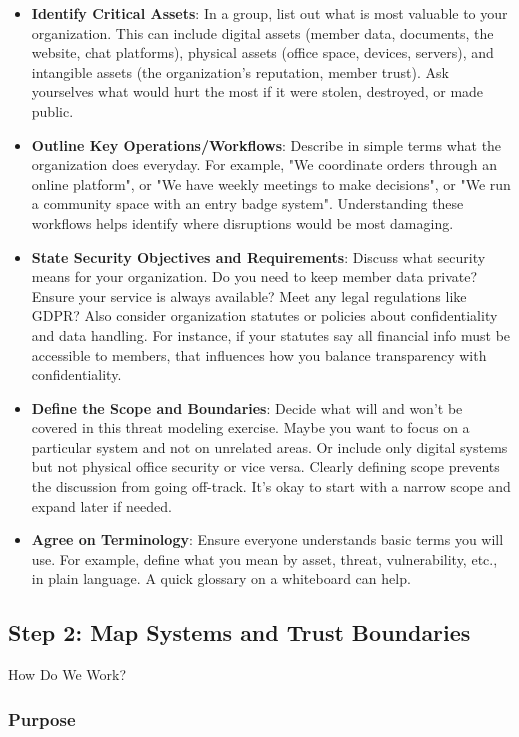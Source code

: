 \begin{itemize}
    \item \textbf{Identify Critical Assets}: In a group, list out what is most
valuable to your organization. This can include digital assets (member data,
documents, the website, chat platforms), physical assets (office space, devices,
servers), and intangible assets (the organization's reputation, member trust).
Ask yourselves what would hurt the most if it were stolen, destroyed, or made
public.
    \item \textbf{Outline Key Operations/Workflows}: Describe in simple terms
what the organization does everyday. For example, "We coordinate orders through an
online platform", or "We have weekly meetings to make decisions", or "We run a
community space with an entry badge system". Understanding these workflows helps
identify where disruptions would be most damaging.
    \item \textbf{State Security Objectives and Requirements}: Discuss what
security means for your organization. Do you need to keep member data private? Ensure
your service is always available? Meet any legal regulations like
GDPR? Also consider organization statutes or policies about confidentiality and data
handling. For instance, if your statutes say all financial info must be accessible
to members, that influences how you balance transparency with confidentiality.
    \item \textbf{Define the Scope and Boundaries}: Decide what will and won't
be covered in this threat modeling exercise. Maybe you want to focus on a
particular system and not on unrelated areas.
Or include only digital systems but not physical office
security or vice versa. Clearly defining scope prevents the discussion from
going off-track. It's okay to start with a narrow scope and expand later if needed.
    \item \textbf{Agree on Terminology}: Ensure everyone understands basic terms
you will use. For example, define what you mean by asset, threat, vulnerability,
etc., in plain language. A quick glossary on a whiteboard can help.
\end{itemize}

\subsection{Step 2: Map Systems and Trust Boundaries}
\label{subsec:Step2}

How Do We Work?

\subsubsection{Purpose}

